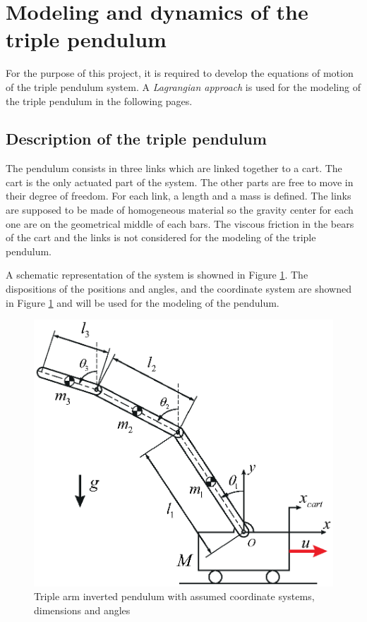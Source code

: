\documentclass[a4paper,12pt,twoside]{article}
\begin{document}
\section{Modeling and dynamics of the triple pendulum}
For the purpose of this project, it is required to develop the equations of motion of the triple pendulum system. A \emph{Lagrangian approach} is used for the modeling of the triple pendulum in the following pages.

\subsection{Description of the triple pendulum}
The pendulum consists in three links which are linked together to a cart. The cart is the only actuated part of the system. The other parts are free to move in their degree of freedom. For each link, a length and a mass is defined. The links are supposed to be made of homogeneous material so the gravity center for each one are on the geometrical middle of each bars. The viscous friction in the bears of the cart and the links is not considered for the modeling of the triple pendulum.

A schematic representation of the system is showned in Figure \ref{fig:schematic_system}. The dispositions of the positions and angles, and the coordinate system are showned in Figure \ref{fig:schematic_system} and will be used for the modeling of the pendulum. 
\begin{figure}[ht]
	\centering
	\includegraphics[width=12cm]{illustrations/schematic_system.eps}
	\caption{Triple arm inverted pendulum with assumed coordinate systems, dimensions and angles}
	\label{fig:schematic_system}
\end{figure}
\end{document}
